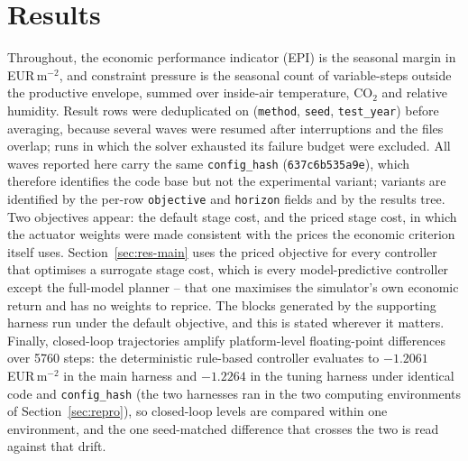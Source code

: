 
\section{Results}
\label{sec:results}

Throughout, the economic performance indicator (EPI) is the seasonal margin in
EUR\,m$^{-2}$, and constraint pressure is the seasonal count of variable-steps outside the
productive envelope, summed over inside-air temperature, CO$_2$ and relative humidity. Result rows were deduplicated on
(\texttt{method}, \texttt{seed}, \texttt{test\_year}) before averaging, because several
waves were resumed after interruptions and the files overlap; runs in which the solver
exhausted its failure budget were excluded. All waves reported here carry the same
\texttt{config\_hash} (\texttt{637c6b535a9e}), which therefore identifies the code base but
not the experimental variant; variants are identified by the per-row
\texttt{objective} and \texttt{horizon} fields and by the results tree. Two objectives
appear: the default stage cost, and the priced stage cost, in which the actuator
weights were made consistent with the prices the economic criterion itself uses.
Section~\ref{sec:res-main} uses the priced objective for every controller that optimises a
surrogate stage cost, which is every model-predictive controller except the full-model
planner -- that one maximises the simulator's own economic return and has no weights to
reprice. The blocks generated by the supporting harness run under the default objective,
and this is stated wherever it matters. Finally, closed-loop trajectories
amplify platform-level floating-point differences over 5760 steps: the deterministic
rule-based controller evaluates to $-1.2061$ EUR\,m$^{-2}$ in the main harness and
$-1.2264$ in the tuning harness under identical code and \texttt{config\_hash} (the two
harnesses ran in the two computing environments of Section~\ref{sec:repro}), so
closed-loop levels are compared within one environment, and the one seed-matched
difference that crosses the two is read against that drift.

